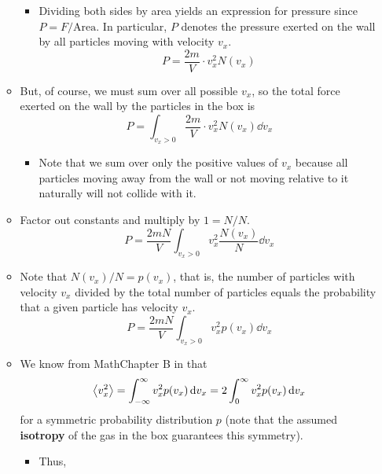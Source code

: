 \documentclass[../notes.tex]{subfiles}
\begin{document}
\begin{itemize}
\begin{itemize}
\begin{itemize}
            \item Dividing both sides by area yields an expression for pressure since $P=F/\text{Area}$. In particular, $P$ denotes the pressure exerted on the wall by all particles moving with velocity $v_x$.
            \begin{equation*}
                P = \frac{2m}{V}\cdot v_x^2N(v_x)
            \end{equation*}
        \end{itemize}
        \item But, of course, we must sum over all possible $v_x$, so the total force exerted on the wall by the particles in the box is
        \begin{equation*}
            P = \int_{v_x>0}\frac{2m}{V}\cdot v_x^2N(v_x)\dd{v_x}
        \end{equation*}
        \begin{itemize}
            \item Note that we sum over only the positive values of $v_x$ because all particles moving away from the wall or not moving relative to it naturally will not collide with it.
        \end{itemize}
        \item Factor out constants and multiply by $1=N/N$.
        \begin{equation*}
            P = \frac{2mN}{V}\int_{v_x>0}v_x^2\frac{N(v_x)}{N}\dd{v_x}
        \end{equation*}
        \item Note that $N(v_x)/N=p(v_x)$, that is, the number of particles with velocity $v_x$ divided by the total number of particles equals the probability that a given particle has velocity $v_x$.
        \begin{equation*}
            P = \frac{2mN}{V}\int_{v_x>0}v_x^2p(v_x)\dd{v_x}
        \end{equation*}
        \item We know from MathChapter B in \textcite{bib:McQuarrieSimon} that
        \begin{equation*}
            \left\langle{v_x^2}\right\rangle = \int_{-\infty}^\infty v_x^2p(v_x)\dd{v_x}
            = 2\int_0^\infty v_x^2p(v_x)\dd{v_x}
        \end{equation*}
        for a symmetric probability distribution $p$ (note that the assumed \textbf{isotropy} of the gas in the box guarantees this symmetry).
        \begin{itemize}
            \item Thus,
            \begin{equation*}

\end{equation*}
\end{itemize}
\end{itemize}
\end{itemize}
\end{document}
